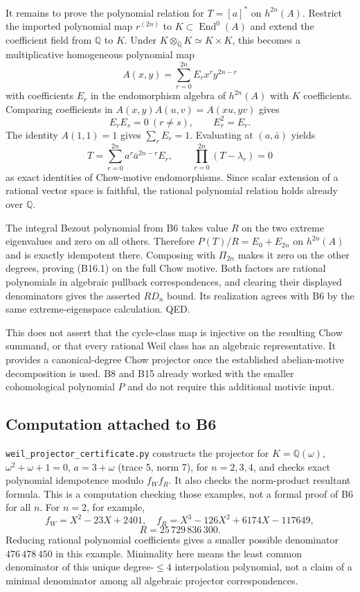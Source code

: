 \documentclass[11pt,a4paper]{article}
\theoremstyle{definition}
\begin{document}
It remains to prove the polynomial relation for \(T=[a]^*\) on \(h^{2n}(A)\). Restrict the imported polynomial map \(r^{(2n)}\) to \(K\subset\operatorname{End}^0(A)\) and extend the coefficient field from \(\mathbb Q\) to \(K\). Under \(K\otimes_{\mathbb Q}K\simeq K\times K\), this becomes a multiplicative homogeneous polynomial map \[
 A(x,y)=\sum_{r=0}^{2n}E_r x^r y^{2n-r}
\] with coefficients \(E_r\) in the endomorphism algebra of \(h^{2n}(A)\) with \(K\) coefficients. Comparing coefficients in \(A(x,y)A(u,v)=A(xu,yv)\) gives \[
 E_rE_s=0\ (r\ne s),\qquad E_r^2=E_r.
\] The identity \(A(1,1)=1\) gives \(\sum_r E_r=1\). Evaluating at \((a,\bar a)\) yields \[
 T=\sum_{r=0}^{2n}a^r\bar a^{2n-r}E_r,
 \qquad \prod_{r=0}^{2n}(T-\lambda_r)=0
\] as exact identities of Chow-motive endomorphisms. Since scalar extension of a rational vector space is faithful, the rational polynomial relation holds already over \(\mathbb Q\).

The integral Bezout polynomial from B6 takes value \(R\) on the two extreme eigenvalues and zero on all others. Therefore \(P(T)/R=E_0+E_{2n}\) on \(h^{2n}(A)\) and is exactly idempotent there. Composing with \(\Pi_{2n}\) makes it zero on the other degrees, proving (B16.1) on the full Chow motive. Both factors are rational polynomials in algebraic pullback correspondences, and clearing their displayed denominators gives the asserted \(R D_n\) bound. Its realization agrees with B6 by the same extreme-eigenspace calculation. QED.

This does not assert that the cycle-class map is injective on the resulting Chow summand, or that every rational Weil class has an algebraic representative. It provides a canonical-degree Chow projector once the established abelian-motive decomposition is used. B8 and B15 already worked with the smaller cohomological polynomial \(P\) and do not require this additional motivic input.

\subsection{Computation attached to B6}\label{computation-attached-to-b6}

\texttt{weil\_projector\_certificate.py} constructs the projector for \(K=\mathbb Q(\omega)\), \(\omega^2+\omega+1=0\), \(a=3+\omega\) (trace 5, norm 7), for \(n=2,3,4\), and checks exact polynomial idempotence modulo \(f_W f_R\). It also checks the norm-product resultant formula. This is a computation checking those examples, not a formal proof of B6 for all \(n\). For \(n=2\), for example, \[
 f_W=X^2-23X+2401,\quad f_R=X^3-126X^2+6174X-117649,
\] \[
 R=25\,729\,836\,300.
\] Reducing rational polynomial coefficients gives a smaller possible denominator \(476\,478\,450\) in this example. Minimality here means the least common denominator of this unique degree-\(\leq4\) interpolation polynomial, not a claim of a minimal denominator among all algebraic projector correspondences.
\end{document}
